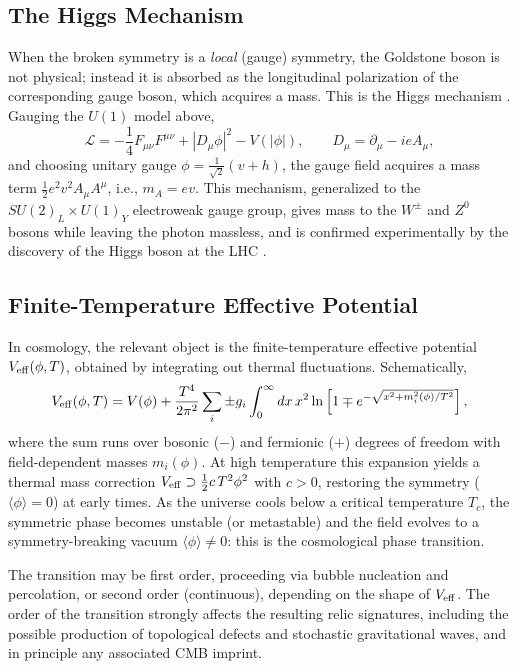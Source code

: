 \documentclass[11pt]{article}
\begin{document}
\subsection{The Higgs Mechanism}

When the broken symmetry is a \emph{local} (gauge) symmetry, the Goldstone boson is not physical; instead it is absorbed as the longitudinal polarization of the corresponding gauge boson, which acquires a mass. This is the Higgs mechanism \citep{Higgs1964,Englert1964,Guralnik1964}. Gauging the $U(1)$ model above,
\begin{equation}
\mathcal{L} = -\frac{1}{4}F_{\mu\nu}F^{\mu\nu} + |D_\mu \phi|^2 - V(|\phi|), \qquad D_\mu = \partial_\mu - ie A_\mu,
\end{equation}
and choosing unitary gauge $\phi = \frac{1}{\sqrt{2}}(v+h)$, the gauge field acquires a mass term $\frac{1}{2}e^2 v^2 A_\mu A^\mu$, i.e., $m_A = ev$. This mechanism, generalized to the $SU(2)_L \times U(1)_Y$ electroweak gauge group, gives mass to the $W^\pm$ and $Z^0$ bosons while leaving the photon massless, and is confirmed experimentally by the discovery of the Higgs boson at the LHC \citep{ATLAS2012,CMS2012}.

\subsection{Finite-Temperature Effective Potential}

In cosmology, the relevant object is the finite-temperature effective potential $V_{\rm eff}(\phi,T)$, obtained by integrating out thermal fluctuations. Schematically,
\begin{equation}
V_{\rm eff}(\phi,T) = V(\phi) + \frac{T^4}{2\pi^2}\sum_i \pm g_i \int_0^\infty dx\, x^2 \ln\left[1 \mp e^{-\sqrt{x^2 + m_i^2(\phi)/T^2}}\right],
\end{equation}
where the sum runs over bosonic ($-$) and fermionic ($+$) degrees of freedom with field-dependent masses $m_i(\phi)$. At high temperature this expansion yields a thermal mass correction $V_{\rm eff} \supset \frac{1}{2}c\,T^2 \phi^2$ with $c>0$, restoring the symmetry ($\langle \phi \rangle = 0$) at early times. As the universe cools below a critical temperature $T_c$, the symmetric phase becomes unstable (or metastable) and the field evolves to a symmetry-breaking vacuum $\langle \phi \rangle \neq 0$: this is the cosmological phase transition.

The transition may be first order, proceeding via bubble nucleation and percolation, or second order (continuous), depending on the shape of $V_{\rm eff}$. The order of the transition strongly affects the resulting relic signatures, including the possible production of topological defects and stochastic gravitational waves, and in principle any associated CMB imprint.
\end{document}
